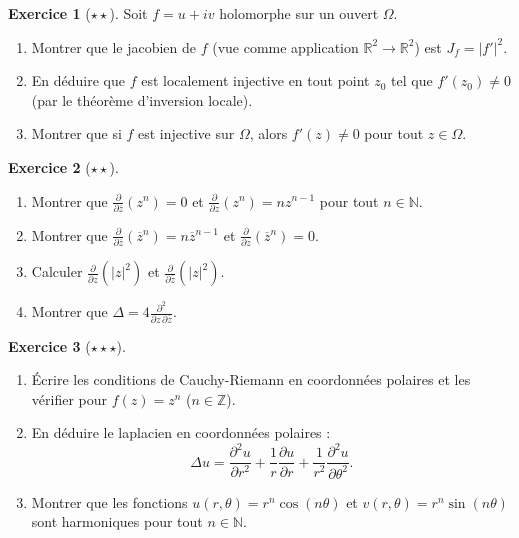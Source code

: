 \documentclass[12pt,a4paper,openany]{book}
\theoremstyle{definition}
\newtheorem{exercice}{Exercice}[chapter]
\theoremstyle{plain}
\theoremstyle{remark}
\newcommand{\R}{\mathbb{R}}
\newcommand{\Z}{\mathbb{Z}}
\newcommand{\N}{\mathbb{N}}
\newcommand{\abs}[1]{\left|#1\right|}
\newcommand{\conj}[1]{\overline{#1}}
\begin{document}
\begin{exercice}[$\star\star$]\label{exo:jacobien-holomorphe}
Soit $f = u + iv$ holomorphe sur un ouvert $\Omega$.
\begin{enumerate}[label=(\alph*)]
  \item Montrer que le jacobien de $f$ (vue comme application $\R^2 \to \R^2$) est $J_f = \abs{f'}^2$.
  \item En déduire que $f$ est localement injective en tout point $z_0$ tel que $f'(z_0) \neq 0$ (par le théorème d'inversion locale).
  \item Montrer que si $f$ est injective sur $\Omega$, alors $f'(z) \neq 0$ pour tout $z \in \Omega$.
\end{enumerate}
\end{exercice}

\begin{exercice}[$\star\star$]\label{exo:wirtinger-calcul}
\begin{enumerate}[label=(\alph*)]
  \item Montrer que $\frac{\partial}{\partial\conj{z}}(z^n) = 0$ et $\frac{\partial}{\partial z}(z^n) = nz^{n-1}$ pour tout $n \in \N$.
  \item Montrer que $\frac{\partial}{\partial\conj{z}}(\conj{z}^n) = n\conj{z}^{n-1}$ et $\frac{\partial}{\partial z}(\conj{z}^n) = 0$.
  \item Calculer $\frac{\partial}{\partial z}(\abs{z}^2)$ et $\frac{\partial}{\partial\conj{z}}(\abs{z}^2)$.
  \item Montrer que $\Delta = 4\frac{\partial^2}{\partial z\,\partial\conj{z}}$.
\end{enumerate}
\end{exercice}

\begin{exercice}[$\star\star\star$]\label{exo:CR-polaires-exo}
\begin{enumerate}[label=(\alph*)]
  \item Écrire les conditions de Cauchy-Riemann en coordonnées polaires et les vérifier pour $f(z) = z^n$ ($n \in \Z$).
  \item En déduire le laplacien en coordonnées polaires :
  \[
    \Delta u = \frac{\partial^2 u}{\partial r^2} + \frac{1}{r}\frac{\partial u}{\partial r} + \frac{1}{r^2}\frac{\partial^2 u}{\partial\theta^2}.
  \]
  \item Montrer que les fonctions $u(r,\theta) = r^n\cos(n\theta)$ et $v(r,\theta) = r^n\sin(n\theta)$ sont harmoniques pour tout $n \in \N$.
\end{enumerate}
\end{exercice}
\end{document}
